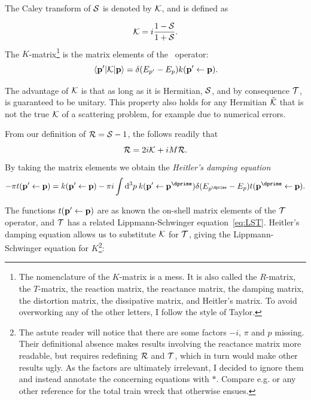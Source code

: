 The Caley transform of \(\mathcal{S}\) is denoted by \(\mathcal{K}\), and is defined
as

\begin{equation*}
  \mathcal{K} = i \frac{1-\mathcal{S}}{1+\mathcal{S}}.
\end{equation*}
The \(K\)-matrix\footnote{The nomenclature of the \(K\)-matrix is a mess. It is
  also called the \(R\)-matrix, the \(T\)-matrix, the reaction matrix, the
  reactance matrix, the damping matrix, the distortion matrix, the dissipative
  matrix, and Heitler's
  matrix. To avoid overworking any of the other
  letters, I follow the style of Taylor.} is the matrix elements of the\
 operator:
\begin{equation*}
  \mel{\vb{p}^{\prime}}{\mathcal{K}}{\vb{p}} = \delta(E_{p^{\prime}}-E_{p})k(\vb{p}^{\prime}\leftarrow\vb{p}).
\end{equation*}

The advantage of \(\mathcal{K}\) is that as long as it is Hermitian, \(\mathcal{S}\),
and by consequence \(\mathcal{T}\), is guaranteed to be unitary. This property also
holds for any Hermitian \(\tilde{\mathcal{K}}\) that is not the true \(\mathcal{K}\) of a
scattering problem, for example due to numerical errors\cite{laszlo,reactance}.


From our definition of \(\mathcal{R}=\mathcal{S}-1\), the follows readily that
\begin{equation*}
  \mathcal{R} = 2i\mathcal{K} + iM\mathcal{R}.
\end{equation*}
By taking the matrix elements we obtain the \textit{Heitler's damping equation}
\begin{equation*}
  -\pi t(\vb{p}^{\prime}\leftarrow\vb{p}) = k(\vb{p}^{\prime}\leftarrow\vb{p}) - \pi i
  \int \dd^{3}p\: k(\vb{p}^{\prime}\leftarrow\vb{p}^{\dprime}) \delta(E_{p^{\dprime}}-E_{p})t(\vb{p}^{\dprime}\leftarrow\vb{p}).
\end{equation*}

The functions \(t(\vb{p}^{\prime}\leftarrow\vb{p}) \) are as known the on-shell
matrix elements of the \(\mathcal{T}\) operator, and \(\mathcal{T}\) has a related
Lippmann-Schwinger equation~\eqref{eq:LST}. Heitler's damping equation allows us
to substitute \(\mathcal{K}\) for \(\mathcal{T}\), giving the Lippmann-Schwinger
equation for \(K\)\footnote{The astute reader will notice that there are some
  factors \(-i\), \(\pi\) and \(p\) missing. Their definitional absence makes results
  involving the reactance matrix more readable, but requires redefining
  \(\mathcal{R}\) and \(\mathcal{T}\), which in turn would make other results ugly. As the
  factors are ultimately irrelevant, I decided to ignore them and instead
  annotate the concerning equations with \(*\). Compare e.g.
  \cite{taylor,morten,reactance} or any other reference for the total train wreck
  that
  otherwise ensues.}:

